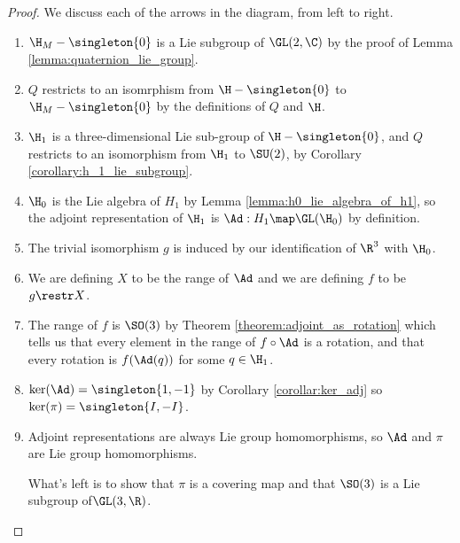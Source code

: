 \documentclass[oneside,12pt]{amsart}
\begin{document}
\begin{proof} We discuss each of the arrows in the diagram, from left to right. 
\begin{enumerate}
\item $\H_M - \singleton{0}$ is a Lie subgroup of $\GL(2,\C)$ by the proof of Lemma \ref{lemma:quaternion_lie_group}.
\item $Q$ restricts to an isomrphism from $\H - \singleton{0}$ to $\H_M - \singleton{0}$ by the definitions of $Q$ and $\H$.
\item  $\H_1$ is a three-dimensional Lie sub-group of $\H-\singleton{0}$, and $Q$ restricts to an isomorphism
from $\H_1$ to $\SU(2)$, by Corollary \ref{corollary:h_1_lie_subgroup}.
\item $\H_0$ is the Lie algebra of $H_1$ by Lemma \ref{lemma:h0_lie_algebra_of_h1}, so the adjoint representation of
$\H_1$ is $\Ad:H_1\map\GL(\H_0)$ by definition.
\item The trivial isomorphism $g$ is induced by our identification of $\R^3$ with $\H_0$.
\item We are defining $X$ to be the range of $\Ad$ and we are defining $f$ to be $g\restr X$.
\item The range of $f$ is $\SO(3)$ by Theorem \ref{theorem:adjoint_as_rotation}
which tells us that every element in the range of $f \circ \Ad$ is a rotation, and that every rotation is 
$f(\Ad(q))$ for some $q\in\H_1$.
\item $\ker(\Ad) = \singleton{1,-1}$ by Corollary \ref{corollar:ker_adj} so $\ker(\pi) = \singleton{I, -I}$.
\item Adjoint representations are always Lie group homomorphisms, so $\Ad$ and $\pi$ are Lie group homomorphisms.

What's left is to show that $\pi$ is a covering map and that $\SO(3)$ is a Lie subgroup of$\GL(3,\R)$.
\end{enumerate}
\end{proof}




\end{document}
